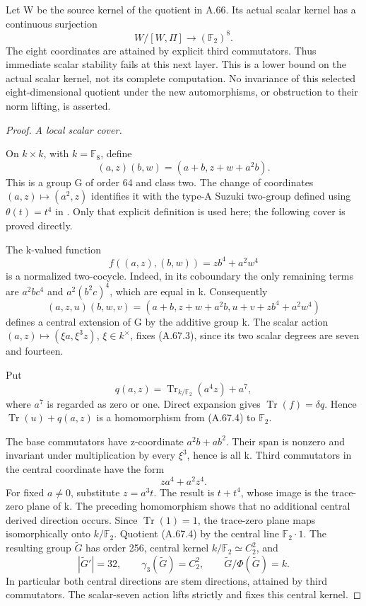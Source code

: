 Let W be the source kernel of the quotient in A.66. Its actual scalar
kernel has a continuous surjection
\[
 W/[W,\Pi]\longrightarrow (\mathbb F_2)^8.
 \tag{A.67.1}
\]
The eight coordinates are attained by explicit third commutators.
Thus immediate scalar stability fails at this next layer. This is a
lower bound on the actual scalar kernel, not its complete computation.
No invariance of this selected eight-dimensional quotient under the
new automorphisms, or obstruction to their norm lifting, is asserted.

\begin{proof}
\emph{A local scalar cover.}\par
On \(k\times k\), with \(k=\mathbb F_8\), define
\[
 (a,z)(b,w)=(a+b,z+w+a^2b).
 \tag{A.67.2}
\]
This is a group G of order 64 and class two. The change of coordinates
\((a,z)\mapsto(a^2,z)\) identifies it with the type-A Suzuki
two-group defined using \(\theta(t)=t^4\) in
\citet[Section 2, p.~3]{AEaton2024}. Only that explicit definition
is used here; the following cover is proved directly.

The k-valued function
\[
 f((a,z),(b,w))=z b^4+a^2w^4
 \tag{A.67.3}
\]
is a normalized two-cocycle. Indeed, in its coboundary the only
remaining terms are \(a^2bc^4\) and
\(a^2(b^2c)^4\), which are equal in k. Consequently
\[
 (a,z,u)(b,w,v)=
 (a+b,z+w+a^2b,u+v+z b^4+a^2w^4)
 \tag{A.67.4}
\]
defines a central extension of G by the additive group k.
The scalar action \((a,z)\mapsto(\xi a,\xi^3z)\),
\(\xi\in k^\times\), fixes (A.67.3), since its two
scalar degrees are seven and fourteen.

Put
\[
 q(a,z)=\operatorname{Tr}_{k/\mathbb F_2}(a^4z)+a^7,
 \tag{A.67.5}
\]
where \(a^7\) is regarded as zero or one. Direct expansion gives
\(\operatorname{Tr}(f)=\delta q\). Hence
\(\operatorname{Tr}(u)+q(a,z)\) is a homomorphism from
(A.67.4) to \(\mathbb F_2\).

The base commutators have z-coordinate \(a^2b+ab^2\).
Their span is nonzero and invariant under multiplication by
every \(\xi^3\), hence is all k. Third commutators in the central
coordinate have the form
\[
 z a^4+a^2z^4.
 \tag{A.67.6}
\]
For fixed \(a\ne0\), substitute \(z=a^3t\). The result is
\(t+t^4\), whose image is the trace-zero plane of k.
The preceding homomorphism shows that no additional central
derived direction occurs. Since \(\operatorname{Tr}(1)=1\),
the trace-zero plane maps isomorphically onto \(k/\mathbb F_2\).
Quotient (A.67.4) by the central line \(\mathbb F_2\cdot1\).
The resulting group \(\widetilde G\) has order 256, central
kernel \(k/\mathbb F_2\simeq C_2^2\), and
\[
 |\widetilde G'|=32,\qquad
 \gamma_3(\widetilde G)=C_2^2,\qquad
 \widetilde G/\Phi(\widetilde G)=k.
 \tag{A.67.7}
\]
In particular both central directions are stem directions,
attained by third commutators. The scalar-seven action lifts
strictly and fixes this central kernel.


\end{proof}
